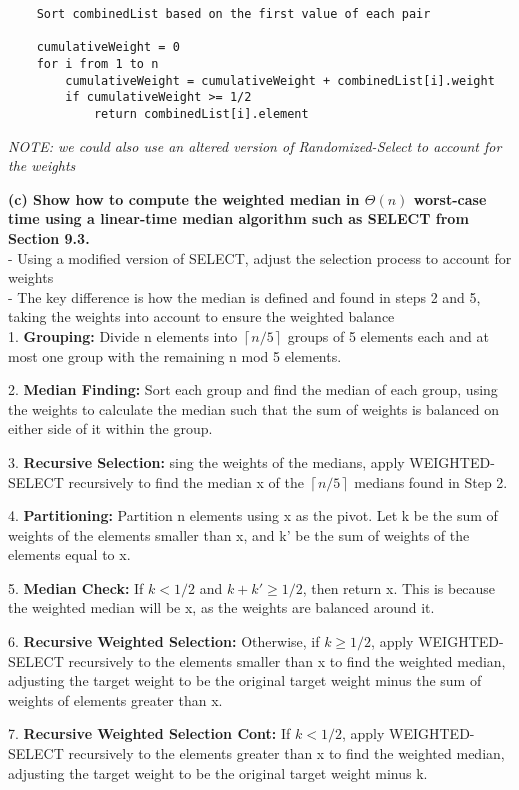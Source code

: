 \documentclass[letterpaper,12pt]{article}
\newcommand{\ceil}[1]{\left\lceil{#1}\right\rceil}
\begin{document}
\begin{enumerate}
\begin{verbatim}
    Sort combinedList based on the first value of each pair

    cumulativeWeight = 0
    for i from 1 to n
        cumulativeWeight = cumulativeWeight + combinedList[i].weight
        if cumulativeWeight >= 1/2
            return combinedList[i].element

\end{verbatim}
\textit{NOTE: we could also use an altered version of Randomized-Select to account for the weights}

\textbf{(c) Show how to compute the weighted median in $\Theta(n)$ worst-case time using a
linear-time median algorithm such as SELECT from Section 9.3.} \\
- Using a modified version of SELECT, adjust the selection process to account for weights \\
-  The key difference is how the median is defined and found in steps 2 and 5, taking the weights into account to ensure the weighted balance \\

1. \textbf{Grouping:} Divide n elements into \(\ceil{n/5}\) groups of 5 elements each and at most one group with the remaining n mod 5 elements. 

2. \textbf{Median Finding:} Sort each group and find the median of each group, using the weights to calculate the median such that the sum of weights is balanced on either side of it within the group.

3. \textbf{Recursive Selection:} sing the weights of the medians, apply WEIGHTED-SELECT recursively to find the median x of the \(\ceil{n/5}\) medians found in Step 2.

4. \textbf{Partitioning:} Partition n elements using x as the pivot. Let k be the sum of weights of the elements smaller than x, and k' be the sum of weights of the elements equal to x.

5. \textbf{Median Check:} If \(k < 1/2\) and \( k + k' \geq 1/2\), then return x. This is because the weighted median will be x, as the weights are balanced around it.

6. \textbf{Recursive Weighted Selection:} Otherwise, if \( k \geq 1/2\), apply WEIGHTED-SELECT recursively to the elements smaller than x to find the weighted median, adjusting the target weight to be the original target weight minus the sum of weights of elements greater than x.

7. \textbf{Recursive Weighted Selection Cont:} If \(k < 1/2\), apply WEIGHTED-SELECT recursively to the elements greater than x to find the weighted median, adjusting the target weight to be the original target weight minus k.


\end{enumerate}
\end{document}
